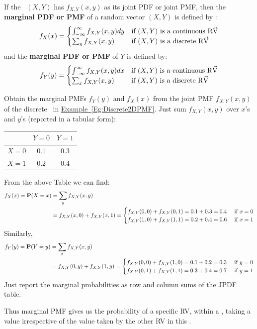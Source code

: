 \begin{definition}
If the \rv~$(X,Y)$ has $f_{X,Y}(x,y)$ as its joint PDF or joint PMF, then the 
{\bf marginal PDF or PMF} of a random vector $(X,Y)$ is defined by :
\[
f_{X}(x) =
\begin{cases}
\int_{-\infty}^{\infty} f_{X,Y}(x,y) dy & \text{if $(X,Y)$ is a continuous {\mbox{R$\vec{\text V}$}}}  \\
\sum_{y} f_{X,Y}(x,y) & \text{if $(X,Y)$ is a discrete {\mbox{R$\vec{\text V}$}}} \\
\end{cases}
\]
and the  {\bf marginal PDF or PMF} of $Y$ is defined by:
\[
f_{Y}(y) = 
\begin{cases}
\int_{-\infty}^{\infty} f_{X,Y}(x,y) dx & \text{if $(X,Y)$ is a continuous {\mbox{R$\vec{\text V}$}}}  \\
\sum_{x} f_{X,Y}(x,y) & \text{if $(X,Y)$ is a discrete {\mbox{R$\vec{\text V}$}}} \\
\end{cases}
\]
\end{definition}

\begin{example}
Obtain the marginal PMFs $f_Y(y)$ and $f_X(x)$ from the joint PMF $f_{X,Y}(x,y)$ of the discrete \rv~in \hyperref[Eg:Discrete2DPMF]{Example~\ref*{Eg:Discrete2DPMF}}.
Just sum $f_{X,Y}(x,y)$ over $x$'s and $y$'s (reported in a tabular form):
\begin{center}
\begin{tabular}{|c|c c|}
\hline
& $Y=0$ & $Y=1$ \\ \hline
$X=0$& $0.1$ & $0.3$  \\
$X=1$& $0.2$ & $0.4$  \\ \hline
\end{tabular}
\end{center}
From the above Table we can find:
\begin{align*}
f_X(x) = \mathbf{P}(X=x) 
&= \sum_{y} f_{X,Y}(x,y) \\
&= 
f_{X,Y}(x,0) + f_{X,Y}(x,1) = 
\begin{cases}
f_{X,Y}(0,0) + f_{X,Y}(0,1) = 0.1+0.3=0.4 & \text{ if } x=0\\
f_{X,Y}(1,0) + f_{X,Y}(1,1) = 0.2+0.4=0.6 & \text{ if } x=1\\
\end{cases}
\end{align*}
Similarly,
\begin{align*}
f_Y(y) = \mathbf{P}(Y=y) 
&= \sum_{x} f_{X,Y}(x,y) \\
&= 
f_{X,Y}(0,y) + f_{X,Y}(1,y) 
= 
\begin{cases}
f_{X,Y}(0,0) + f_{X,Y}(1,0) = 0.1+0.2=0.3 & \text{ if } y=0\\
f_{X,Y}(0,1) + f_{X,Y}(1,1) = 0.3+0.4=0.7 & \text{ if } y=1\\
\end{cases}
\end{align*}
Just report the marginal probabilities as row and column sums of the JPDF table.

Thus marginal PMF gives us the probability of a specific RV, within a \rv, taking a value irrespective of the value taken by the other RV in this \rv. 
\end{example}

